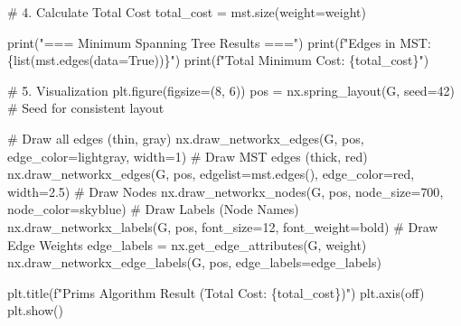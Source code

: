 \documentclass[
  letterpaper,
  DIV=11,
  numbers=noendperiod]{scrreprt}
\newenvironment{Shaded}{\begin{snugshade}}{\end{snugshade}}
\newcommand{\BuiltInTok}[1]{\textcolor[rgb]{0.00,0.23,0.31}{#1}}
\newcommand{\CommentTok}[1]{\textcolor[rgb]{0.37,0.37,0.37}{#1}}
\newcommand{\DecValTok}[1]{\textcolor[rgb]{0.68,0.00,0.00}{#1}}
\newcommand{\FloatTok}[1]{\textcolor[rgb]{0.68,0.00,0.00}{#1}}
\newcommand{\NormalTok}[1]{\textcolor[rgb]{0.00,0.23,0.31}{#1}}
\newcommand{\OperatorTok}[1]{\textcolor[rgb]{0.37,0.37,0.37}{#1}}
\newcommand{\SpecialCharTok}[1]{\textcolor[rgb]{0.37,0.37,0.37}{#1}}
\newcommand{\SpecialStringTok}[1]{\textcolor[rgb]{0.13,0.47,0.30}{#1}}
\newcommand{\StringTok}[1]{\textcolor[rgb]{0.13,0.47,0.30}{#1}}
\newcommand{\VariableTok}[1]{\textcolor[rgb]{0.07,0.07,0.07}{#1}}
\begin{document}
\begin{Shaded}
\begin{Highlighting}[]
\CommentTok{\# 4. Calculate Total Cost}
\NormalTok{total\_cost }\OperatorTok{=}\NormalTok{ mst.size(weight}\OperatorTok{=}\StringTok{\textquotesingle{}weight\textquotesingle{}}\NormalTok{)}

\BuiltInTok{print}\NormalTok{(}\StringTok{"=== Minimum Spanning Tree Results ==="}\NormalTok{)}
\BuiltInTok{print}\NormalTok{(}\SpecialStringTok{f"Edges in MST: }\SpecialCharTok{\{}\BuiltInTok{list}\NormalTok{(mst.edges(data}\OperatorTok{=}\VariableTok{True}\NormalTok{))}\SpecialCharTok{\}}\SpecialStringTok{"}\NormalTok{)}
\BuiltInTok{print}\NormalTok{(}\SpecialStringTok{f"Total Minimum Cost: }\SpecialCharTok{\{}\NormalTok{total\_cost}\SpecialCharTok{\}}\SpecialStringTok{"}\NormalTok{)}

\CommentTok{\# 5. Visualization}
\NormalTok{plt.figure(figsize}\OperatorTok{=}\NormalTok{(}\DecValTok{8}\NormalTok{, }\DecValTok{6}\NormalTok{))}
\NormalTok{pos }\OperatorTok{=}\NormalTok{ nx.spring\_layout(G, seed}\OperatorTok{=}\DecValTok{42}\NormalTok{)  }\CommentTok{\# Seed for consistent layout}

\CommentTok{\# Draw all edges (thin, gray)}
\NormalTok{nx.draw\_networkx\_edges(G, pos, edge\_color}\OperatorTok{=}\StringTok{\textquotesingle{}lightgray\textquotesingle{}}\NormalTok{, width}\OperatorTok{=}\DecValTok{1}\NormalTok{)}
\CommentTok{\# Draw MST edges (thick, red)}
\NormalTok{nx.draw\_networkx\_edges(G, pos, edgelist}\OperatorTok{=}\NormalTok{mst.edges(), edge\_color}\OperatorTok{=}\StringTok{\textquotesingle{}red\textquotesingle{}}\NormalTok{, width}\OperatorTok{=}\FloatTok{2.5}\NormalTok{)}
\CommentTok{\# Draw Nodes}
\NormalTok{nx.draw\_networkx\_nodes(G, pos, node\_size}\OperatorTok{=}\DecValTok{700}\NormalTok{, node\_color}\OperatorTok{=}\StringTok{\textquotesingle{}skyblue\textquotesingle{}}\NormalTok{)}
\CommentTok{\# Draw Labels (Node Names)}
\NormalTok{nx.draw\_networkx\_labels(G, pos, font\_size}\OperatorTok{=}\DecValTok{12}\NormalTok{, font\_weight}\OperatorTok{=}\StringTok{\textquotesingle{}bold\textquotesingle{}}\NormalTok{)}
\CommentTok{\# Draw Edge Weights}
\NormalTok{edge\_labels }\OperatorTok{=}\NormalTok{ nx.get\_edge\_attributes(G, }\StringTok{\textquotesingle{}weight\textquotesingle{}}\NormalTok{)}
\NormalTok{nx.draw\_networkx\_edge\_labels(G, pos, edge\_labels}\OperatorTok{=}\NormalTok{edge\_labels)}

\NormalTok{plt.title(}\SpecialStringTok{f"Prim\textquotesingle{}s Algorithm Result (Total Cost: }\SpecialCharTok{\{}\NormalTok{total\_cost}\SpecialCharTok{\}}\SpecialStringTok{)"}\NormalTok{)}
\NormalTok{plt.axis(}\StringTok{\textquotesingle{}off\textquotesingle{}}\NormalTok{)}
\NormalTok{plt.show()}
\end{Highlighting}
\end{Shaded}
\end{document}

